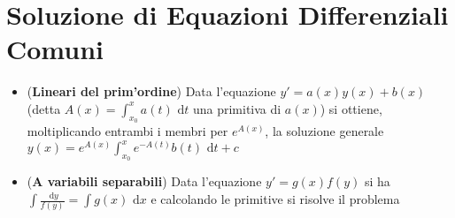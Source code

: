\documentclass[a4paper,NoNotes,GeneralMath]{stdmdoc}
\newcommand{\de}{\mbox{  d}}
\begin{document}
	\section*{Soluzione di Equazioni Differenziali Comuni}
	\begin{itemize}
		\item ({\bf Lineari del prim'ordine}) Data l'equazione $y' = a(x)y(x) + b(x)$ (detta $A(x) = \int_{x_0}^{x} a(t) \de t$ una primitiva di $a(x)$) si ottiene, moltiplicando entrambi i membri per $e^{A(x)}$, la soluzione generale $y(x) = e^{A(x)} \int_{x_0}^{x} e^{-A(t)}b(t) \de t + c$
		\item ({\bf A variabili separabili}) Data l'equazione $y' = g(x)f(y)$ si ha $\int \frac{\de y}{f(y)} = \int g(x) \de x$ e calcolando le primitive si risolve il problema
	\end{itemize}
\end{document}
